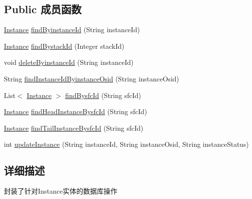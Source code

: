 \subsection*{Public 成员函数}
\begin{DoxyCompactItemize}
\item 
\mbox{\hyperlink{classcom_1_1example_1_1demo_1_1modular_1_1_instance}{Instance}} \mbox{\hyperlink{interfacecom_1_1example_1_1demo_1_1dao_1_1_instance_dao_a4ee5fdf8f3514be1122854f66ac6fbc6}{find\+Byinstance\+Id}} (String instance\+Id)
\item 
\mbox{\hyperlink{classcom_1_1example_1_1demo_1_1modular_1_1_instance}{Instance}} \mbox{\hyperlink{interfacecom_1_1example_1_1demo_1_1dao_1_1_instance_dao_a484d2d6e066536dc4964cd0d5cbe692c}{find\+Bystack\+Id}} (Integer stack\+Id)
\item 
void \mbox{\hyperlink{interfacecom_1_1example_1_1demo_1_1dao_1_1_instance_dao_acf1620c05d10ec03f7e0216c68ecb962}{delete\+Byinstance\+Id}} (String instance\+Id)
\item 
String \mbox{\hyperlink{interfacecom_1_1example_1_1demo_1_1dao_1_1_instance_dao_a4f228f3c7d5dff96854ef66a87632881}{find\+Instance\+Id\+Byinstance\+Osid}} (String instance\+Osid)
\item 
List$<$ \mbox{\hyperlink{classcom_1_1example_1_1demo_1_1modular_1_1_instance}{Instance}} $>$ \mbox{\hyperlink{interfacecom_1_1example_1_1demo_1_1dao_1_1_instance_dao_a053211768d8b136e67793dcb8768efe3}{find\+Bysfc\+Id}} (String sfc\+Id)
\item 
\mbox{\hyperlink{classcom_1_1example_1_1demo_1_1modular_1_1_instance}{Instance}} \mbox{\hyperlink{interfacecom_1_1example_1_1demo_1_1dao_1_1_instance_dao_a8aa7b6652212f322edade19651b4b686}{find\+Head\+Instance\+Bysfc\+Id}} (String sfc\+Id)
\item 
\mbox{\hyperlink{classcom_1_1example_1_1demo_1_1modular_1_1_instance}{Instance}} \mbox{\hyperlink{interfacecom_1_1example_1_1demo_1_1dao_1_1_instance_dao_a5e63c119847d4bc9e17b81801cf3b5fc}{find\+Tail\+Instance\+Bysfc\+Id}} (String sfc\+Id)
\item 
int \mbox{\hyperlink{interfacecom_1_1example_1_1demo_1_1dao_1_1_instance_dao_af656afb3a343904d20a1882a8058f202}{update\+Instance}} (String instance\+Id, String instance\+Osid, String instance\+Status)
\end{DoxyCompactItemize}


\subsection{详细描述}
封装了针对\+Instance实体的数据库操作 

